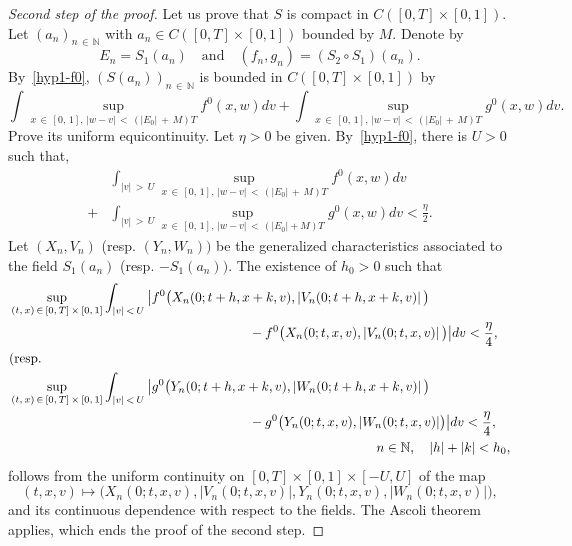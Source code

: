 \documentclass[AHL,Unicode,longabstracts,published]{cedram}
\newcommand{\N}{\mathbb{N}}
\begin{document}
\begin{proof}[{Second step of the proof}]
Let us prove that $S$ is compact in $C([0,T] \times [0,1])$. Let $(a_n)_{n\,\in\,\N}$ with $a_n\in C([0,T] \times [0,1])$ bounded by $M$. Denote by
\[
E_n = S_1\left(a_n\right)\quad \text{and} \quad \left(f_n,g_n\right) = \left(S_2 \circ S_1\right)\left(a_n\right).
\]
By~\eqref{hyp1-f0}, $(S(a_n))_{n\,\in\,\N}$ is bounded in $C([0,T] \times [0,1])$ by
\[
\int \sup_{x\,\in\,[0,\,1],\,|w-v|\,<\,\left(\left|E_0\right|\,+\,M\right)T} f^0(x,w)dv + \int \sup_{x\,\in\,[0,\,1],\,|w-v|\,<\,\left(\left|E_0\right|\,+\,M\right)T} g^0(x,w)dv.
\]
Prove its uniform equicontinuity. Let $\eta>0$ be given. By~\eqref{hyp1-f0}, there is $U>0$ such that,
\begin{align*}
&\int_{|v|\,>\,U} \sup_{x\,\in\,[0,\,1],\,|w-v|\,<\,\left(|E_0|\,+\,M\right)T} f^0(x,w)dv\\
+&\int_{|v|\,>\,U} \sup_{x\,\in\,[0,\,1],\,|w-v|\,<\,\left(|E_0|+M\right)T} g^0(x,w)dv < \frac{\eta }{2}.
\end{align*}
Let $(X_n,V_n)$ (resp. $(Y_n,W_n))$ be the generalized characteristics associated to the field $S_1(a_n)$ (resp. $-S_1(a_n))$. The existence of $h_0>0$ such that
\begin{align*}
&\sup _{(t,\,x)\,\in\,[0,\,T]\,\times\,[0,\,1]} \int_{|v|\,<\,U} \big| f^0\big(X_n(0;t+h,x+k,v),\left\lvert V_n(0;t+h,x+k,v)\right\rvert\big) \\
& \hspace*{2.5in}-f^0\big(X_n(0;t,x,v),\left\lvert V_n(0;t,x,v)\right\rvert\big) \big| dv < \frac{\eta }{4}, \\
&(\text{resp. } \\
&\sup_{(t,\,x)\,\in\,[0,\,T]\,\times\,[0,\,1]} \int _{|v|\,<\,U} \big| g^0\big(Y_n(0;t+h,x+k,v),\left\lvert W_n(0;t+h,x+k,v)\right\rvert\big) \\
&\hspace*{2.5in}-g^0\big(Y_n(0;t,x,v),\lvert W_n(0;t,x,v)\rvert\big) \big| dv < \frac{\eta }{4}, \\
&\hspace*{3.83in}n \in \N,\quad |h|+|k|<h_0,
\end{align*}
follows from the uniform continuity on $[0,T] \times [0,1] \times [-U,U]$ of the map
\[
(t,x,v) \mapsto \big (X_n(0;t,x,v), \lvert V_n(0;t,x,v)\rvert, Y_n(0;t,x,v), \lvert W_n(0;t,x,v) \rvert \big),
\]
and its continuous dependence with respect to the fields. The Ascoli theorem applies, which ends the proof of the second step.
\end{proof}
\end{document}

